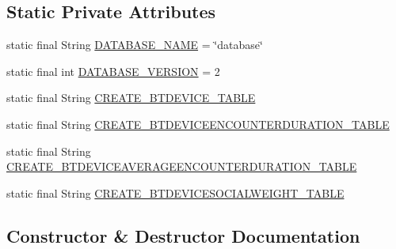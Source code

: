 \subsection*{Static Private Attributes}
\begin{DoxyCompactItemize}
\item 
static final String \hyperlink{classcom_1_1social_1_1proximity_1_1_s_q_lite_helper_a46aed568d90b22207e3c240e37de865b}{D\+A\+T\+A\+B\+A\+S\+E\+\_\+\+N\+A\+M\+E} = \char`\"{}database\char`\"{}
\item 
static final int \hyperlink{classcom_1_1social_1_1proximity_1_1_s_q_lite_helper_a7e5876fc2bc6861e6fbb1c84616dcd07}{D\+A\+T\+A\+B\+A\+S\+E\+\_\+\+V\+E\+R\+S\+I\+O\+N} = 2
\item 
static final String \hyperlink{classcom_1_1social_1_1proximity_1_1_s_q_lite_helper_a008345746681ebe4ff451e164809f343}{C\+R\+E\+A\+T\+E\+\_\+\+B\+T\+D\+E\+V\+I\+C\+E\+\_\+\+T\+A\+B\+L\+E}
\item 
static final String \hyperlink{classcom_1_1social_1_1proximity_1_1_s_q_lite_helper_aa47200bd55a879de8afff2709a50cc76}{C\+R\+E\+A\+T\+E\+\_\+\+B\+T\+D\+E\+V\+I\+C\+E\+E\+N\+C\+O\+U\+N\+T\+E\+R\+D\+U\+R\+A\+T\+I\+O\+N\+\_\+\+T\+A\+B\+L\+E}
\item 
static final String \hyperlink{classcom_1_1social_1_1proximity_1_1_s_q_lite_helper_ad6fd653f953e708728c7e84845208638}{C\+R\+E\+A\+T\+E\+\_\+\+B\+T\+D\+E\+V\+I\+C\+E\+A\+V\+E\+R\+A\+G\+E\+E\+N\+C\+O\+U\+N\+T\+E\+R\+D\+U\+R\+A\+T\+I\+O\+N\+\_\+\+T\+A\+B\+L\+E}
\item 
static final String \hyperlink{classcom_1_1social_1_1proximity_1_1_s_q_lite_helper_a2ffdca634cf057e96a94972b2e5704e4}{C\+R\+E\+A\+T\+E\+\_\+\+B\+T\+D\+E\+V\+I\+C\+E\+S\+O\+C\+I\+A\+L\+W\+E\+I\+G\+H\+T\+\_\+\+T\+A\+B\+L\+E}
\end{DoxyCompactItemize}


\subsection{Constructor \& Destructor Documentation}
\hypertarget{classcom_1_1social_1_1proximity_1_1_s_q_lite_helper_a4bda85b0b433c8670f2ec11706fdbf53}{}
